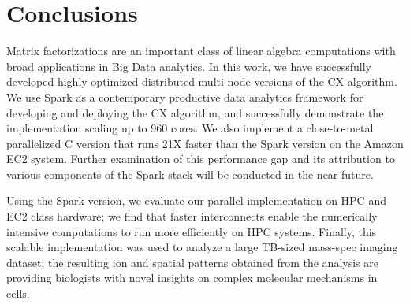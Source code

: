 \section{Conclusions}
\label{sec:conclusion}

Matrix factorizations are an important class of linear algebra computations
with broad applications in Big Data analytics. In this work, we have
successfully developed highly optimized distributed multi-node
versions of the CX algorithm.
We use
Spark as a contemporary productive data analytics framework for developing and deploying
the CX algorithm, and successfully demonstrate the implementation scaling up to
960 cores. 
We also implement a close-to-metal parallelized C version that runs 21X
faster than the Spark version on the Amazon EC2 system. Further examination of
this performance gap and its attribution to various components of the Spark
stack will be conducted in the near future. 

Using the Spark version, we evaluate our parallel implementation on HPC and EC2 class
hardware; we find that faster interconnects enable the numerically intensive
computations to run more efficiently on HPC systems. Finally, this scalable
implementation was used to analyze a large TB-sized mass-spec imaging
dataset; the resulting ion and spatial patterns obtained from the analysis are
providing biologists with novel insights on complex molecular mechanisms in
cells. 


